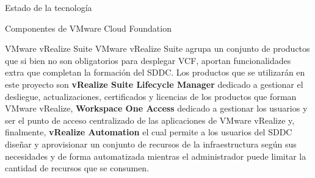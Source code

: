 \begin{section}{Estado de la tecnología}
\begin{subsection}{Componentes de VMware Cloud Foundation}
\begin{subsubsection}{VMware vRealize Suite}
    VMware vRealize Suite agrupa un conjunto de productos que si bien no son obligatorios para desplegar VCF, aportan funcionalidades extra que completan la formación del SDDC. Los productos que se utilizarán en este proyecto son \textbf{vRealize Suite Lifecycle Manager} dedicado a gestionar el desliegue, actualizaciones, certificados y licencias de los productos que forman VMware vRealize, \textbf{Workspace One Access} dedicado a gestionar los usuarios y ser el punto de acceso centralizado de las aplicaciones de VMware vRealize y, finalmente, \textbf{vRealize Automation} el cual permite a los usuarios del SDDC diseñar y aprovisionar un conjunto de recursos de la infraestructura según sus necesidades y de forma automatizada mientras el administrador puede limitar la cantidad de recursos que se consumen.
\end{subsubsection}

\end{subsection}

\end{section}

